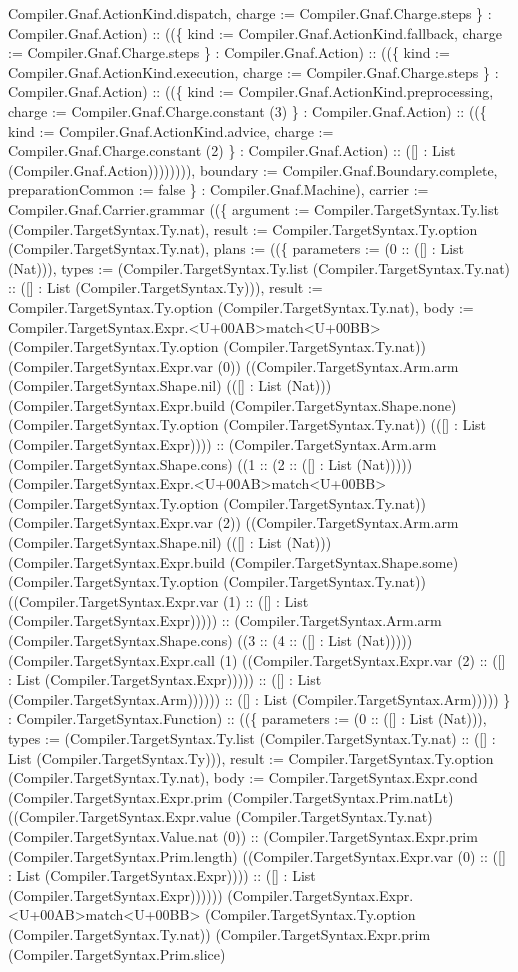 \documentclass[11pt]{article}
\begin{document}
Compiler.Gnaf.ActionKind.dispatch, charge := Compiler.Gnaf.Charge.steps \} : Compiler.Gnaf.Action) :: ((\{ kind := Compiler.Gnaf.ActionKind.fallback, charge := Compiler.Gnaf.Charge.steps \} : Compiler.Gnaf.Action) :: ((\{ kind := Compiler.Gnaf.ActionKind.execution, charge := Compiler.Gnaf.Charge.steps \} : Compiler.Gnaf.Action) :: ((\{ kind := Compiler.Gnaf.ActionKind.preprocessing, charge := Compiler.Gnaf.Charge.constant (3) \} : Compiler.Gnaf.Action) :: ((\{ kind := Compiler.Gnaf.ActionKind.advice, charge := Compiler.Gnaf.Charge.constant (2) \} : Compiler.Gnaf.Action) :: ([] : List (Compiler.Gnaf.Action)))))))), boundary := Compiler.Gnaf.Boundary.complete, preparationCommon := false \} : Compiler.Gnaf.Machine), carrier := Compiler.Gnaf.Carrier.grammar ((\{ argument := Compiler.TargetSyntax.Ty.list (Compiler.TargetSyntax.Ty.nat), result := Compiler.TargetSyntax.Ty.option (Compiler.TargetSyntax.Ty.nat), plans := ((\{ parameters := (0 :: ([] : List (Nat))), types := (Compiler.TargetSyntax.Ty.list (Compiler.TargetSyntax.Ty.nat) :: ([] : List (Compiler.TargetSyntax.Ty))), result := Compiler.TargetSyntax.Ty.option (Compiler.TargetSyntax.Ty.nat), body := Compiler.TargetSyntax.Expr.<U+00AB>match<U+00BB> (Compiler.TargetSyntax.Ty.option (Compiler.TargetSyntax.Ty.nat)) (Compiler.TargetSyntax.Expr.var (0)) ((Compiler.TargetSyntax.Arm.arm (Compiler.TargetSyntax.Shape.nil) (([] : List (Nat))) (Compiler.TargetSyntax.Expr.build (Compiler.TargetSyntax.Shape.none) (Compiler.TargetSyntax.Ty.option (Compiler.TargetSyntax.Ty.nat)) (([] : List (Compiler.TargetSyntax.Expr)))) :: (Compiler.TargetSyntax.Arm.arm (Compiler.TargetSyntax.Shape.cons) ((1 :: (2 :: ([] : List (Nat))))) (Compiler.TargetSyntax.Expr.<U+00AB>match<U+00BB> (Compiler.TargetSyntax.Ty.option (Compiler.TargetSyntax.Ty.nat)) (Compiler.TargetSyntax.Expr.var (2)) ((Compiler.TargetSyntax.Arm.arm (Compiler.TargetSyntax.Shape.nil) (([] : List (Nat))) (Compiler.TargetSyntax.Expr.build (Compiler.TargetSyntax.Shape.some) (Compiler.TargetSyntax.Ty.option (Compiler.TargetSyntax.Ty.nat)) ((Compiler.TargetSyntax.Expr.var (1) :: ([] : List (Compiler.TargetSyntax.Expr))))) :: (Compiler.TargetSyntax.Arm.arm (Compiler.TargetSyntax.Shape.cons) ((3 :: (4 :: ([] : List (Nat))))) (Compiler.TargetSyntax.Expr.call (1) ((Compiler.TargetSyntax.Expr.var (2) :: ([] : List (Compiler.TargetSyntax.Expr))))) :: ([] : List (Compiler.TargetSyntax.Arm)))))) :: ([] : List (Compiler.TargetSyntax.Arm))))) \} : Compiler.TargetSyntax.Function) :: ((\{ parameters := (0 :: ([] : List (Nat))), types := (Compiler.TargetSyntax.Ty.list (Compiler.TargetSyntax.Ty.nat) :: ([] : List (Compiler.TargetSyntax.Ty))), result := Compiler.TargetSyntax.Ty.option (Compiler.TargetSyntax.Ty.nat), body := Compiler.TargetSyntax.Expr.cond (Compiler.TargetSyntax.Expr.prim (Compiler.TargetSyntax.Prim.natLt) ((Compiler.TargetSyntax.Expr.value (Compiler.TargetSyntax.Ty.nat) (Compiler.TargetSyntax.Value.nat (0)) :: (Compiler.TargetSyntax.Expr.prim (Compiler.TargetSyntax.Prim.length) ((Compiler.TargetSyntax.Expr.var (0) :: ([] : List (Compiler.TargetSyntax.Expr)))) :: ([] : List (Compiler.TargetSyntax.Expr)))))) (Compiler.TargetSyntax.Expr.<U+00AB>match<U+00BB> (Compiler.TargetSyntax.Ty.option (Compiler.TargetSyntax.Ty.nat)) (Compiler.TargetSyntax.Expr.prim (Compiler.TargetSyntax.Prim.slice) 
\end{document}
